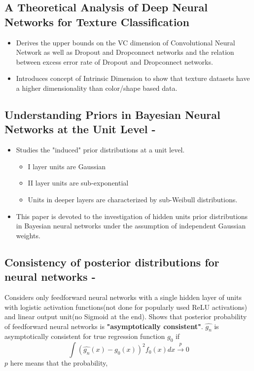 \documentclass[a4paper,twocolumn]{article}
\begin{document}
\subsection{A Theoretical Analysis of Deep Neural Networks for Texture Classification \cite{VC-CNN}}
\label{sec-3-4}
\begin{itemize}
\item Derives the upper bounds on the VC dimension of Convolutional Neural Network as well as Dropout and Dropconnect networks and the relation between excess error rate of Dropout and Dropconnect networks.

\item Introduces concept  of Intrinsic  Dimension to  show  that  texture  datasets  have  a higher dimensionality than color/shape based data.
\end{itemize}

\subsection{Understanding Priors in Bayesian Neural Networks at the Unit Level - \cite{vladimirova2019understanding}}
\label{sec-3-5}
\begin{itemize}
\item Studies the "induced" prior distributions at a unit level. 
\begin{itemize}
\item I layer units are Gaussian
\item II layer units are sub-exponential
\item Units in deeper layers are characterized by sub-Weibull distributions.
\end{itemize}
\item This paper is devoted to the investigation of hidden units prior distributions in Bayesian neural networks under the assumption of independent Gaussian weights.
\end{itemize}

\subsection{Consistency of posterior distributions for neural networks - \cite{lee2000consistency}}
\label{sec-3-6}

Considers only feedforward neural networks with a single hidden layer of units with logistic activation functions(not done for popularly used ReLU activations) and linear output unit(no Sigmoid at the end).
Shows that posterior probability of feedforward neural networks is \textbf{"asymptotically consistent"}. \( \hat{g_n} \) is asymptotically consistent for true regression function \( g_0 \) if
\begin{equation}
    \int (\hat{g_n}(x) - g_0(x))^2f_0(x)dx \xrightarrow{p} 0
\end{equation}
\( p \) here means that the probability, 
\end{document}
